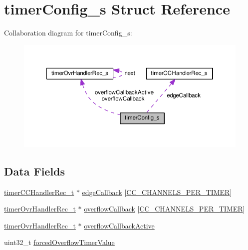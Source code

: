 \hypertarget{structtimerConfig__s}{\section{timer\+Config\+\_\+s Struct Reference}
\label{structtimerConfig__s}
}


Collaboration diagram for timer\+Config\+\_\+s\+:\nopagebreak
\begin{figure}[H]
\begin{center}
\leavevmode
\includegraphics[width=350pt]{structtimerConfig__s__coll__graph}
\end{center}
\end{figure}
\subsection*{Data Fields}
\begin{DoxyCompactItemize}
\item 
\hyperlink{timer_8h_ae46420e9784a27eb4d9769ea453ac9cd}{timer\+C\+C\+Handler\+Rec\+\_\+t} $\ast$ \hyperlink{structtimerConfig__s_a1a87609027e48b8074a6e1f2e9738498}{edge\+Callback} \mbox{[}\hyperlink{timer_8c_a495f6714674004bc378d4af797798c10}{C\+C\+\_\+\+C\+H\+A\+N\+N\+E\+L\+S\+\_\+\+P\+E\+R\+\_\+\+T\+I\+M\+E\+R}\mbox{]}
\item 
\hyperlink{timer_8h_a20efe19715701da0b5e7942daf6f9728}{timer\+Ovr\+Handler\+Rec\+\_\+t} $\ast$ \hyperlink{structtimerConfig__s_a3afc65145acd1add4dab12f9babccbe8}{overflow\+Callback} \mbox{[}\hyperlink{timer_8c_a495f6714674004bc378d4af797798c10}{C\+C\+\_\+\+C\+H\+A\+N\+N\+E\+L\+S\+\_\+\+P\+E\+R\+\_\+\+T\+I\+M\+E\+R}\mbox{]}
\item 
\hyperlink{timer_8h_a20efe19715701da0b5e7942daf6f9728}{timer\+Ovr\+Handler\+Rec\+\_\+t} $\ast$ \hyperlink{structtimerConfig__s_a65ea1a39aba83eaab55aef7c0cea049e}{overflow\+Callback\+Active}
\item 
uint32\+\_\+t \hyperlink{structtimerConfig__s_a616d1b6e69e169f8a5fc74f3ed9cc33d}{forced\+Overflow\+Timer\+Value}
\end{DoxyCompactItemize}


